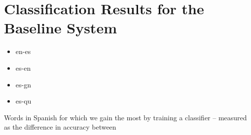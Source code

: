 \section{Classification Results for the Baseline System}

\begin{itemize}
\item en-es
\item es-en
\item es-gn
\item es-qu
\end{itemize}

Words in Spanish for which we gain the most by training a classifier --
measured as the difference in accuracy between
